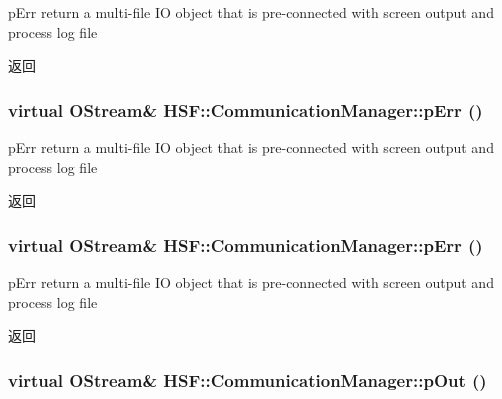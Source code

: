 pErr return a multi-\/file IO object that is pre-\/connected with screen output and process log file \begin{DoxyReturn}{返回}

\end{DoxyReturn}
\hypertarget{classHSF_1_1CommunicationManager_a416b9b36a5831fee0b931405bcad3e97}{
\subsubsection[{pErr}]{\setlength{\rightskip}{0pt plus 5cm}virtual {\bf OStream}\& HSF::CommunicationManager::pErr ()}}
\label{classHSF_1_1CommunicationManager_a416b9b36a5831fee0b931405bcad3e97}


pErr return a multi-\/file IO object that is pre-\/connected with screen output and process log file \begin{DoxyReturn}{返回}

\end{DoxyReturn}
\hypertarget{classHSF_1_1CommunicationManager_a416b9b36a5831fee0b931405bcad3e97}{
\subsubsection[{pErr}]{\setlength{\rightskip}{0pt plus 5cm}virtual {\bf OStream}\& HSF::CommunicationManager::pErr ()}}
\label{classHSF_1_1CommunicationManager_a416b9b36a5831fee0b931405bcad3e97}


pErr return a multi-\/file IO object that is pre-\/connected with screen output and process log file \begin{DoxyReturn}{返回}

\end{DoxyReturn}
\hypertarget{classHSF_1_1CommunicationManager_a90bf65f0e45df795cf861f829b82ac3d}{
\subsubsection[{pOut}]{\setlength{\rightskip}{0pt plus 5cm}virtual {\bf OStream}\& HSF::CommunicationManager::pOut ()}}
\label{classHSF_1_1CommunicationManager_a90bf65f0e45df795cf861f829b82ac3d}


